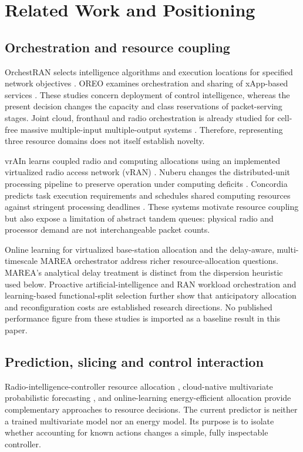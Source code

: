 \documentclass[10pt,a4paper]{article}
\begin{document}
\section{Related Work and Positioning}
\subsection{Orchestration and resource coupling}
OrchestRAN selects intelligence algorithms and execution locations for specified
network objectives \cite{orchestr}. OREO examines orchestration and sharing of
xApp-based services \cite{oreo}. These studies concern deployment of control
intelligence, whereas the present decision changes the capacity and class
reservations of packet-serving stages. Joint cloud, fronthaul and radio
orchestration is already studied for cell-free massive multiple-input
multiple-output systems \cite{demir}. Therefore, representing three resource
domains does not itself establish novelty.

vrAIn learns coupled radio and computing allocations using an implemented
virtualized radio access network (vRAN) \cite{vrain}. Nuberu changes the distributed-unit
processing pipeline to preserve operation under computing deficits \cite{nuberu}.
Concordia predicts task execution requirements and schedules shared computing
resources against stringent processing deadlines \cite{concordia}. These systems
motivate resource coupling but also expose a limitation of abstract tandem queues:
physical radio and processor demand are not interchangeable packet counts.

Online learning for virtualized base-station allocation \cite{kalntis} and the
delay-aware, multi-timescale MAREA orchestrator \cite{marea} address richer
resource-allocation questions. MAREA's analytical delay treatment is distinct
from the dispersion heuristic used below. Proactive artificial-intelligence
and RAN workload orchestration \cite{caora} and learning-based functional-split
selection \cite{murti} further show that anticipatory allocation and reconfiguration
costs are established research directions. No published performance figure from
these studies is imported as a baseline result in this paper.

\subsection{Prediction, slicing and control interaction}
Radio-intelligence-controller resource allocation \cite{wang}, cloud-native
multivariate probabilistic forecasting \cite{kasuluru}, and online-learning
energy-efficient allocation \cite{sora} provide complementary approaches to
resource decisions. The current predictor is neither a trained multivariate
model nor an energy model. Its purpose is to isolate whether accounting for
known actions changes a simple, fully inspectable controller.
\end{document}
